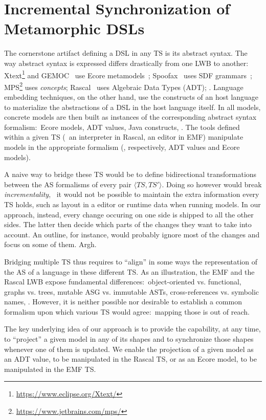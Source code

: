 \documentclass[sigplan]{acmart}
\begin{document}
\section{Incremental Synchronization of Metamorphic DSLs}
The cornerstone artifact defining a DSL in any TS is its abstract syntax.
The way abstract syntax is expressed differs drastically from one LWB to another: Xtext\footnote{\url{https://www.eclipse.org/Xtext/}} and GEMOC~\cite{bousse2016execution} use Ecore metamodels~\cite{steinberg2008emf}; Spoofax~\cite{kats2010spoofax} uses SDF grammars~\cite{heering1989syntax}; MPS\footnote{\url{https://www.jetbrains.com/mps/}} uses \emph{concepts}; Rascal~\cite{klint2010easy} uses Algebraic Data Types (ADT); \etc.
Language embedding techniques, on the other hand, use the constructs of an host language to materialize the abstractions of a DSL in the host language itself.
In all models, concrete models are then built as instances of the corresponding abstract syntax formalism:~Ecore models, ADT values, Java constructs, \etc.
The tools defined within a given TS (\eg~an interpreter in Rascal, an editor in EMF) manipulate models in the appropriate formalism (\eg, respectively, ADT values and Ecore models).

A naive way to bridge these TS would be to define bidirectional transformations between the AS formalisms of every pair $\langle TS, TS' \rangle$.
Doing so however would break \emph{incrementality}, \ie~it would not be possible to maintain the extra information every TS holds, such as layout in a editor or runtime data when running models.
In our approach, instead, every change occuring on one side is shipped to all the other sides.
The latter then decide which parts of the changes they want to take into account.
An outline, for instance, would probably ignore most of the changes and focus on some of them. Argh.

Bridging multiple TS thus requires to ``align'' in some ways the representation of the AS of a language in these different TS.
As an illustration, the EMF and the Rascal LWB expose fundamental differences:~object-oriented vs. functional, graphs vs. trees, mutable ASG vs. immutable ASTs, cross-references vs. symbolic names, \etc.
However, it is neither possible nor desirable to establish a common formalism upon which various TS would agree:~mapping those is out of reach.

The key underlying idea of our approach is to provide the capability, at any time, to ``project'' a given model in any of its shapes and to synchronize those shapes whenever one of them is updated.
We enable the projection of a given model as an ADT value, to be manipulated in the Rascal TS, or as an Ecore model, to be manipulated in the EMF TS.
\end{document}
